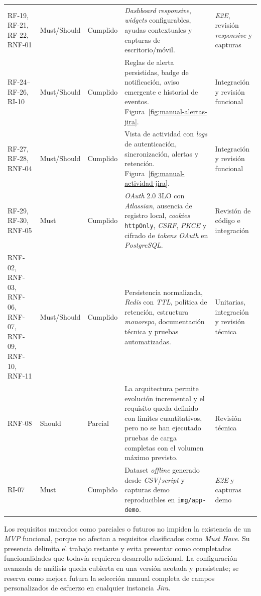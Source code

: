 {\begin{longtable}{p{1.65cm}p{1.55cm}p{1.65cm}p{5.35cm}p{2.45cm}}
RF-19, RF-21, RF-22, RNF-01 & Must/Should & Cumplido & \textit{Dashboard} \textit{responsive}, \textit{widgets} configurables, ayudas contextuales y capturas de escritorio/móvil. & \textit{E2E}, revisión \textit{responsive} y capturas \\
RF-24--RF-26, RI-10 & Must/Should & Cumplido & Reglas de alerta persistidas, badge de notificación, aviso emergente e historial de eventos. Figura~\ref{fig:manual-alertas-jira}. & Integración y revisión funcional \\
RF-27, RF-28, RNF-04 & Must/Should & Cumplido & Vista de actividad con \textit{logs} de autenticación, sincronización, alertas y retención. Figura~\ref{fig:manual-actividad-jira}. & Integración y revisión funcional \\
RF-29, RF-30, RNF-05 & Must & Cumplido & \textit{OAuth} 2.0 3LO con \textit{Atlassian}, ausencia de registro local, \textit{cookies} \texttt{httpOnly}, \textit{CSRF}, \textit{PKCE} y cifrado de \textit{tokens} \textit{OAuth} en \textit{PostgreSQL}. & Revisión de código e integración \\
RNF-02, RNF-03, RNF-06, RNF-07, RNF-09, RNF-10, RNF-11 & Must/Should & Cumplido & Persistencia normalizada, \textit{Redis} con \textit{TTL}, política de retención, estructura \textit{monorepo}, documentación técnica y pruebas automatizadas. & Unitarias, integración y revisión técnica \\
RNF-08 & Should & Parcial & La arquitectura permite evolución incremental y el requisito queda definido con límites cuantitativos, pero no se han ejecutado pruebas de carga completas con el volumen máximo previsto. & Revisión técnica \\
RI-07 & Must & Cumplido & Dataset \textit{offline} generado desde \textit{CSV}/\textit{script} y capturas demo reproducibles en \texttt{img/app-demo}. & \textit{E2E} y capturas demo \\
\bottomrule
\end{longtable}
\vspace{0.45em}
}

Los requisitos marcados como parciales o futuros no impiden la existencia de un \textit{MVP} funcional, porque no afectan a requisitos clasificados como \textit{Must Have}. Su presencia delimita el trabajo restante y evita presentar como completadas funcionalidades que todavía requieren desarrollo adicional. La configuración avanzada de análisis queda cubierta en una versión acotada y persistente; se reserva como mejora futura la selección manual completa de campos personalizados de esfuerzo en cualquier instancia \textit{Jira}.

